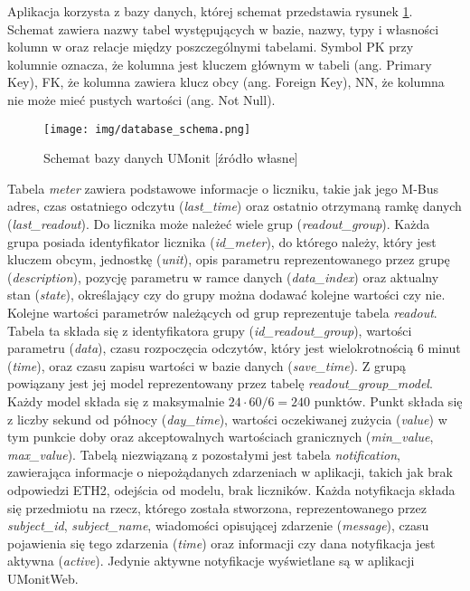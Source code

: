 Aplikacja korzysta z bazy danych, której schemat przedstawia rysunek \ref{fig:database_schema}.
Schemat zawiera nazwy tabel występujących w bazie, nazwy, typy i własności kolumn w oraz relacje między poszczególnymi tabelami.
Symbol PK przy kolumnie oznacza, że kolumna jest kluczem głównym w tabeli (ang. Primary Key), FK, że kolumna zawiera klucz obcy (ang. Foreign Key), NN, że kolumna nie może mieć pustych wartości (ang. Not Null).

\begin{figure}[ht]
	\centering
	\texttt{[image: img/database\_schema.png]}
	\caption[Schemat bazy danych UMonit]{Schemat bazy danych UMonit [źródło własne]}
	\label{fig:database_schema}
\end{figure}

Tabela \textit{meter} zawiera podstawowe informacje o liczniku, takie jak jego M-Bus adres, czas ostatniego odczytu (\textit{last\_time}) oraz ostatnio otrzymaną ramkę danych (\textit{last\_readout}).
Do licznika może należeć wiele grup (\textit{readout\_group}).
Każda grupa posiada identyfikator licznika (\textit{id\_meter}), do którego należy, który jest kluczem obcym, jednostkę (\textit{unit}), opis parametru reprezentowanego przez grupę (\textit{description}), pozycję parametru w ramce danych (\textit{data\_index}) oraz aktualny stan (\textit{state}), określający czy do grupy można dodawać kolejne wartości czy nie.
Kolejne wartości parametrów należących od grup reprezentuje tabela \textit{readout}.
Tabela ta składa się z identyfikatora grupy (\textit{id\_readout\_group}), wartości parametru (\textit{data}), czasu rozpoczęcia odczytów, który jest wielokrotnością $ 6 $ minut (\textit{time}), oraz czasu zapisu wartości w bazie danych (\textit{save\_time}).
Z grupą powiązany jest jej model reprezentowany przez tabelę \textit{readout\_group\_model}.
Każdy model składa się z maksymalnie $ 24 \cdot 60 / 6 = 240 $ punktów.
Punkt składa się z liczby sekund od północy (\textit{day\_time}), wartości oczekiwanej zużycia (\textit{value}) w tym punkcie doby oraz akceptowalnych wartościach granicznych (\textit{min\_value}, \textit{max\_value}).
Tabelą niezwiązaną z pozostałymi jest tabela \textit{notification}, zawierająca informacje o niepożądanych zdarzeniach w aplikacji, takich jak brak odpowiedzi ETH2, odejścia od modelu, brak liczników.
Każda notyfikacja składa się przedmiotu na rzecz, którego została stworzona, reprezentowanego przez \textit{subject\_id}, \textit{subject\_name}, wiadomości opisującej zdarzenie (\textit{message}), czasu pojawienia się tego zdarzenia (\textit{time}) oraz informacji czy dana notyfikacja jest aktywna (\textit{active}).
Jedynie aktywne notyfikacje wyświetlane są w aplikacji UMonitWeb.

